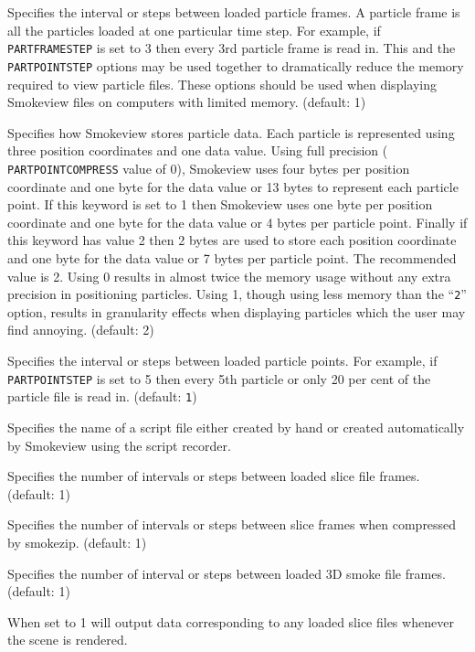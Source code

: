 \documentclass[11pt,twoside]{book}
\newcommand{\hitem}[1]{\item[{\bf #1} \hfill]}
\begin{document}
\hitem{PARTFRAMESTEP}Specifies the interval or steps between
loaded particle frames.  A particle frame is all the particles
loaded at one particular time step. For example, if {\tt
PARTFRAMESTEP} is set to 3 then every 3rd particle frame is read
in. This and the {\tt PARTPOINTSTEP} options may be used together
to dramatically reduce the memory required to view particle
files.  These options should be used when displaying Smokeview
files on computers with limited memory. (default: 1)

\hitem{PARTPOINTCOMPRESS}Specifies how Smokeview stores particle
data. Each particle is represented using three position
coordinates and one data value.  Using full precision ({\tt
PARTPOINTCOMPRESS} value of 0), Smokeview uses four bytes per
position coordinate and one byte for the data value or 13 bytes to
represent each particle point. If this keyword is set to 1 then
Smokeview uses one byte per position coordinate and one byte for
the data value or 4 bytes per particle point.  Finally if this
keyword has value 2 then 2 bytes are used to store each position
coordinate and one byte for the data value or 7 bytes per particle
point.  The recommended value is 2.  Using 0 results in almost
twice the memory usage without any extra precision in positioning
particles. Using 1, though using less memory than the ``{\tt 2}''
option, results in granularity effects when displaying particles
which the user may find annoying. (default: 2)

\hitem{PARTPOINTSTEP}Specifies the
interval or steps between loaded particle points.
For example, if {\tt PARTPOINTSTEP} is set to 5 then every 5th particle or
only 20 per cent of the particle file is read in.  (default: {\tt 1})

\hitem{SCRIPTFILE} Specifies the name of a script file either created by hand or created automatically
by Smokeview using the script recorder.

\hitem{SLICEFRAMESTEP}Specifies the number of
intervals or steps between loaded slice file frames.  (default: 1)

\hitem{SLICEZIPSTEP}  Specifies the number of intervals or steps between slice frames when compressed
by smokezip.  (default: 1)

\hitem{SMOKE3DFRAMESTEP}Specifies the number of
interval or steps between loaded 3D smoke file frames.  (default: 1)

\hitem{SMOKE3DZIPSTEPxxx}

\hitem{SLICEDATAOUT}When set to 1 will output data corresponding
to any loaded slice files whenever the scene is rendered.
\end{document}
